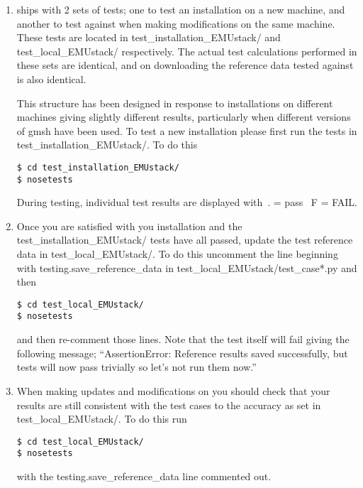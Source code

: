\documentclass[11pt,a4paper,twoside]{report}
\begin{document}
\begin{enumerate}
\item \CodeName ships with 2 sets of tests; one to test an installation on a new machine, and another to test against when making modifications on the same machine. These tests are located in test\_installation\_EMUstack/ and test\_local\_EMUstack/ respectively. The actual test calculations performed in these sets are identical, and on downloading the reference data tested against is also identical.

This structure has been designed in response to installations on different machines giving slightly different results, particularly when different versions of gmsh have been used. To test a new installation please first run the tests in test\_installation\_EMUstack/. To do this

\begin{lstlisting}
$ cd test_installation_EMUstack/
$ nosetests
\end{lstlisting}

During testing, individual test results are displayed with\
. = pass \
F = FAIL.

\item Once you are satisfied with you installation and the test\_installation\_EMUstack/ tests have all passed, update the test reference data in test\_local\_EMUstack/. To do this uncomment the line beginning with testing.save\_reference\_data in test\_local\_EMUstack/test\_case*.py and then

\begin{lstlisting}
$ cd test_local_EMUstack/
$ nosetests
\end{lstlisting}

and then re-comment those lines. Note that the test itself will fail giving the following message;
``AssertionError: Reference results saved successfully, but tests will now pass trivially so let's not run them now.''

\item When making updates and modifications on \CodeName you should check that your results are still consistent with the test cases to the accuracy as set in test\_local\_EMUstack/. To do this run

\begin{lstlisting}
$ cd test_local_EMUstack/
$ nosetests
\end{lstlisting}

with the testing.save\_reference\_data line commented out.
\end{enumerate}
\end{document}
